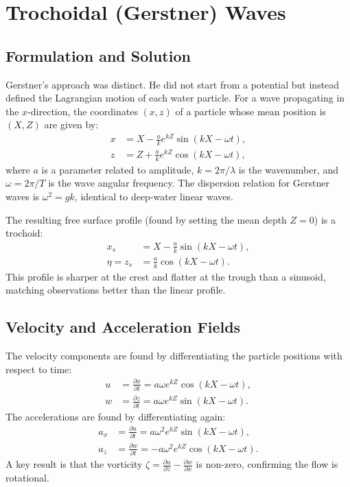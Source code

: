 \documentclass[11pt,letterpaper]{article}
\begin{document}
\section{Trochoidal (Gerstner) Waves}
\subsection{Formulation and Solution}
Gerstner's approach was distinct. He did not start from a potential but instead defined the Lagrangian motion of each water particle. For a wave propagating in the $x$-direction, the coordinates $(x, z)$ of a particle whose mean position is $(X, Z)$ are given by:
\begin{align}
x &= X - \frac{a}{k} e^{kZ} \sin(kX - \omega t), \\
z &= Z + \frac{a}{k} e^{kZ} \cos(kX - \omega t),
\end{align}
where $a$ is a parameter related to amplitude, $k=2\pi/\lambda$ is the wavenumber, and $\omega=2\pi/T$ is the wave angular frequency. The dispersion relation for Gerstner waves is $\omega^2 = gk$, identical to deep-water linear waves.

The resulting free surface profile (found by setting the mean depth $Z=0$) is a trochoid:
\begin{align}
x_s &= X - \frac{a}{k} \sin(kX - \omega t), \\
\eta = z_s &= \frac{a}{k} \cos(kX - \omega t).
\end{align}
This profile is sharper at the crest and flatter at the trough than a sinusoid, matching observations better than the linear profile.

\subsection{Velocity and Acceleration Fields}
The velocity components are found by differentiating the particle positions with respect to time:
\begin{align}
u &= \frac{\partial x}{\partial t} = a \omega e^{kZ} \cos(kX - \omega t), \\
w &= \frac{\partial z}{\partial t} = a \omega e^{kZ} \sin(kX - \omega t).
\end{align}
The accelerations are found by differentiating again:
\begin{align}
a_x &= \frac{\partial u}{\partial t} = a \omega^2 e^{kZ} \sin(kX - \omega t), \\
a_z &= \frac{\partial w}{\partial t} = -a \omega^2 e^{kZ} \cos(kX - \omega t).
\end{align}
A key result is that the vorticity $\zeta = \frac{\partial u}{\partial z} - \frac{\partial w}{\partial x}$ is non-zero, confirming the flow is rotational.
\end{document}
